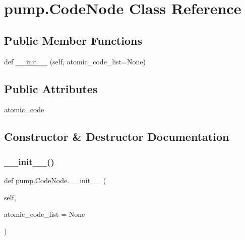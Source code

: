\hypertarget{classpump_1_1_code_node}{}\section{pump.\+Code\+Node Class Reference}
\label{classpump_1_1_code_node}
\subsection*{Public Member Functions}
\begin{DoxyCompactItemize}
\item 
def \hyperlink{classpump_1_1_code_node_a2ca8a75324a64e48004812d6c0bc1cbd}{\+\_\+\+\_\+init\+\_\+\+\_\+} (self, atomic\+\_\+code\+\_\+list=None)
\end{DoxyCompactItemize}
\subsection*{Public Attributes}
\begin{DoxyCompactItemize}
\item 
\hyperlink{classpump_1_1_code_node_ac7251110cc987c709e0e17d95521993e}{atomic\+\_\+code}
\end{DoxyCompactItemize}


\subsection{Constructor \& Destructor Documentation}
\mbox{\label{classpump_1_1_code_node_a2ca8a75324a64e48004812d6c0bc1cbd}} 
\subsubsection{\texorpdfstring{\+\_\+\+\_\+init\+\_\+\+\_\+()}{\_\_init\_\_()}}
{\footnotesize\ttfamily def pump.\+Code\+Node.\+\_\+\+\_\+init\+\_\+\+\_\+ (\begin{DoxyParamCaption}\item[{}]{self,  }\item[{}]{atomic\+\_\+code\+\_\+list = {\ttfamily None} }\end{DoxyParamCaption})}



